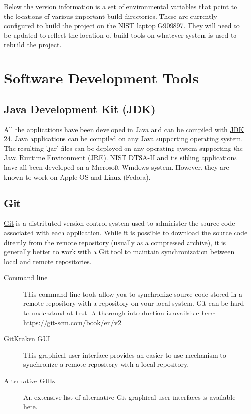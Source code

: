 \documentclass{article}
\begin{document}
Below the version information is a set of environmental variables that point to the locations of various important build directories.  These are currently configured to build the project on the NIST laptop G909897.  They will need to be updated to reflect the location of build tools on whatever system is used to rebuild the project.

\section{Software Development Tools}
\subsection{Java Development Kit (JDK)}
All the applications have been developed in Java and can be compiled with \href{https://adoptium.net/temurin/releases/?os=windows&arch=x64&package=jdk}{JDK 24}.  Java applications can be compiled on any Java supporting operating system.  The resulting '.jar' files can be deployed on any operating system supporting the Java Runtime Environment (JRE). NIST DTSA-II and its sibling applications have all been developed on a Microsoft Windows system.  However, they are known to work on Apple OS and Linux (Fedora).

\subsection{Git}
\href{https://git-scm.com/}{Git} is a distributed version control system used to administer the source code associated with each application.  While it is possible to download the source code directly from the remote repository (usually as a compressed archive), it is generally better to work with a Git tool to maintain synchronization between local and remote repositories.
\begin{description}
    \item[\href{https://git-scm.com/}{Command line}] This command line tools allow you to synchronize source code stored in a remote repository with a repository on your local system.  Git can be hard to understand at first.  A thorough introduction is available here: \url{https://git-scm.com/book/en/v2}
    \item[\href{https://www.gitkraken.com/}{GitKraken GUI}] This graphical user interface provides an easier to use mechanism to synchronize a remote repository with a local repository.
    \item[Alternative GUIs] An extensive list of alternative Git graphical user interfaces is available  \href{https://git-scm.com/downloads/guis}{here}.
\end{description}
\end{document}

